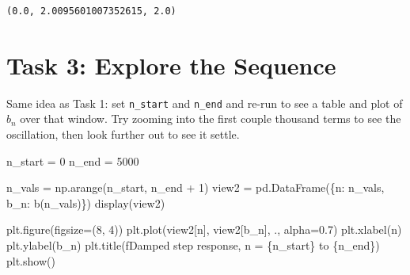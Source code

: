 \documentclass[
  letterpaper,
  DIV=11,
  numbers=noendperiod]{scrreprt}
\newenvironment{Shaded}{\begin{snugshade}}{\end{snugshade}}
\newcommand{\DecValTok}[1]{\textcolor[rgb]{0.68,0.00,0.00}{#1}}
\newcommand{\FloatTok}[1]{\textcolor[rgb]{0.68,0.00,0.00}{#1}}
\newcommand{\NormalTok}[1]{\textcolor[rgb]{0.00,0.23,0.31}{#1}}
\newcommand{\OperatorTok}[1]{\textcolor[rgb]{0.37,0.37,0.37}{#1}}
\newcommand{\SpecialCharTok}[1]{\textcolor[rgb]{0.37,0.37,0.37}{#1}}
\newcommand{\SpecialStringTok}[1]{\textcolor[rgb]{0.13,0.47,0.30}{#1}}
\newcommand{\StringTok}[1]{\textcolor[rgb]{0.13,0.47,0.30}{#1}}
\theoremstyle{plain}
\theoremstyle{plain}
\theoremstyle{definition}
\theoremstyle{definition}
\theoremstyle{definition}
\theoremstyle{plain}
\theoremstyle{plain}
\theoremstyle{remark}
\begin{document}
\begin{verbatim}
(0.0, 2.0095601007352615, 2.0)
\end{verbatim}

\section{Task 3: Explore the
Sequence}\label{task-3-explore-the-sequence}

Same idea as Task 1: set \texttt{n\_start} and \texttt{n\_end} and
re-run to see a table and plot of \(b_n\) over that window. Try zooming
into the first couple thousand terms to see the oscillation, then look
further out to see it settle.

\begin{Shaded}
\begin{Highlighting}[]
\NormalTok{n\_start }\OperatorTok{=} \DecValTok{0}
\NormalTok{n\_end }\OperatorTok{=} \DecValTok{5000}

\NormalTok{n\_vals }\OperatorTok{=}\NormalTok{ np.arange(n\_start, n\_end }\OperatorTok{+} \DecValTok{1}\NormalTok{)}
\NormalTok{view2 }\OperatorTok{=}\NormalTok{ pd.DataFrame(\{}\StringTok{\textquotesingle{}n\textquotesingle{}}\NormalTok{: n\_vals, }\StringTok{\textquotesingle{}b\_n\textquotesingle{}}\NormalTok{: b(n\_vals)\})}
\NormalTok{display(view2)}

\NormalTok{plt.figure(figsize}\OperatorTok{=}\NormalTok{(}\DecValTok{8}\NormalTok{, }\DecValTok{4}\NormalTok{))}
\NormalTok{plt.plot(view2[}\StringTok{\textquotesingle{}n\textquotesingle{}}\NormalTok{], view2[}\StringTok{\textquotesingle{}b\_n\textquotesingle{}}\NormalTok{], }\StringTok{\textquotesingle{}.\textquotesingle{}}\NormalTok{, alpha}\OperatorTok{=}\FloatTok{0.7}\NormalTok{)}
\NormalTok{plt.xlabel(}\StringTok{\textquotesingle{}n\textquotesingle{}}\NormalTok{)}
\NormalTok{plt.ylabel(}\StringTok{\textquotesingle{}b\_n\textquotesingle{}}\NormalTok{)}
\NormalTok{plt.title(}\SpecialStringTok{f\textquotesingle{}Damped step response, n = }\SpecialCharTok{\{}\NormalTok{n\_start}\SpecialCharTok{\}}\SpecialStringTok{ to }\SpecialCharTok{\{}\NormalTok{n\_end}\SpecialCharTok{\}}\SpecialStringTok{\textquotesingle{}}\NormalTok{)}
\NormalTok{plt.show()}
\end{Highlighting}
\end{Shaded}
\end{document}
